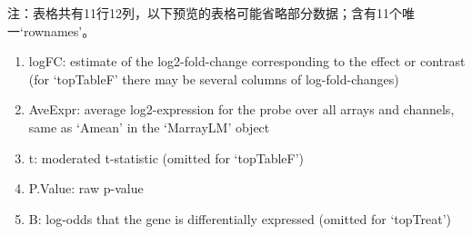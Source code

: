 \documentclass[
]{article}
\providecommand{\tightlist}{%
  \setlength{\itemsep}{0pt}\setlength{\parskip}{0pt}}
\begin{document}
\begin{center}\begin{tcolorbox}[colback=gray!10, colframe=gray!50, width=0.9\linewidth, arc=1mm, boxrule=0.5pt]注：表格共有11行12列，以下预览的表格可能省略部分数据；含有11个唯一`rownames'。
\end{tcolorbox}
\end{center}
\begin{center}\begin{tcolorbox}[colback=gray!10, colframe=gray!50, width=0.9\linewidth, arc=1mm, boxrule=0.5pt]\begin{enumerate}\tightlist
\item logFC:  estimate of the log2-fold-change corresponding to the effect or contrast (for ‘topTableF’ there may be several columns of log-fold-changes)
\item AveExpr:  average log2-expression for the probe over all arrays and channels, same as ‘Amean’ in the ‘MarrayLM’ object
\item t:  moderated t-statistic (omitted for ‘topTableF’)
\item P.Value:  raw p-value
\item B:  log-odds that the gene is differentially expressed (omitted for ‘topTreat’)
\end{enumerate}\end{tcolorbox}
\end{center}
\end{document}
